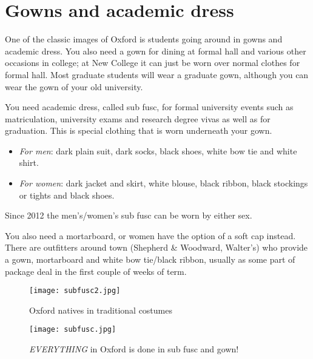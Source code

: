 \section{Gowns and academic dress}\label{AcaDress}
One of the classic images of Oxford is students going around in gowns and academic dress. You also need a gown for dining at formal hall and various other occasions in college; at New College it can just be worn over normal clothes for formal hall. Most graduate students will wear a graduate gown, although you can wear the gown of your old university. 

You need academic dress, called sub fusc, for formal university events such as
matriculation, university exams and research degree vivas as well as for
graduation. This is special clothing that is worn underneath your gown. 
\begin{itemize}

\item \emph{For men}: dark plain suit, dark socks, black shoes, white bow tie
and white shirt. 
\item \emph{For women}: dark jacket and skirt, white blouse, black
ribbon, black stockings or tights and black shoes. 
\end{itemize}
Since 2012 the men's/women's sub fusc can be worn by either sex.

You also need a mortarboard, or women have the option of a soft cap instead. There are outfitters around town (Shepherd \& Woodward, Walter's) who provide a gown, mortarboard and white bow tie/black ribbon, usually as some part of package deal in the first couple of weeks of term.


\begin{figure}[htbp]
\centering
		\begin{minipage}{0.58\textwidth}
        	\centering
				\texttt{[image: subfusc2.jpg]}
				\caption[]{Oxford natives in traditional costumes}
				\label{fig:subfusc}
        \end{minipage}%
        \quad
		\begin{minipage}{0.38\textwidth}
        	\centering
				\texttt{[image: subfusc.jpg]}
				\caption[]{\emph{EVERYTHING} in Oxford is done in sub fusc and
				gown!}
				\label{fig:slack}
        \end{minipage}%
\end{figure}  
  
